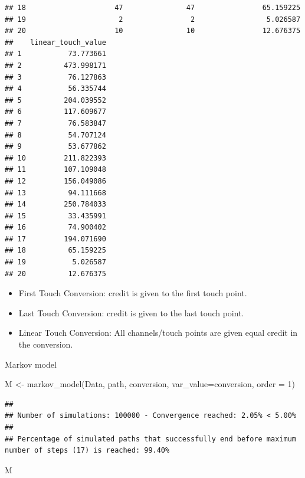 \documentclass[
]{book}
\newenvironment{Shaded}{\begin{snugshade}}{\end{snugshade}}
\newcommand{\AttributeTok}[1]{\textcolor[rgb]{0.77,0.63,0.00}{#1}}
\newcommand{\DecValTok}[1]{\textcolor[rgb]{0.00,0.00,0.81}{#1}}
\newcommand{\FunctionTok}[1]{\textcolor[rgb]{0.00,0.00,0.00}{#1}}
\newcommand{\NormalTok}[1]{#1}
\newcommand{\OtherTok}[1]{\textcolor[rgb]{0.56,0.35,0.01}{#1}}
\newcommand{\StringTok}[1]{\textcolor[rgb]{0.31,0.60,0.02}{#1}}
\begin{document}
\begin{verbatim}
## 18                     47               47                65.159225
## 19                      2                2                 5.026587
## 20                     10               10                12.676375
##    linear_touch_value
## 1           73.773661
## 2          473.998171
## 3           76.127863
## 4           56.335744
## 5          204.039552
## 6          117.609677
## 7           76.583847
## 8           54.707124
## 9           53.677862
## 10         211.822393
## 11         107.109048
## 12         156.049086
## 13          94.111668
## 14         250.784033
## 15          33.435991
## 16          74.900402
## 17         194.071690
## 18          65.159225
## 19           5.026587
## 20          12.676375
\end{verbatim}

\begin{itemize}
\item
  First Touch Conversion: credit is given to the first touch point.
\item
  Last Touch Conversion: credit is given to the last touch point.
\item
  Linear Touch Conversion: All channels/touch points are given equal credit in the conversion.
\end{itemize}

Markov model

\begin{Shaded}
\begin{Highlighting}[]
\NormalTok{M }\OtherTok{\textless{}{-}} \FunctionTok{markov\_model}\NormalTok{(Data, }\StringTok{\textquotesingle{}path\textquotesingle{}}\NormalTok{, }\StringTok{\textquotesingle{}conversion\textquotesingle{}}\NormalTok{, }\AttributeTok{var\_value=}\StringTok{\textquotesingle{}conversion\textquotesingle{}}\NormalTok{, }\AttributeTok{order =} \DecValTok{1}\NormalTok{)}
\end{Highlighting}
\end{Shaded}

\begin{verbatim}
## 
## Number of simulations: 100000 - Convergence reached: 2.05% < 5.00%
## 
## Percentage of simulated paths that successfully end before maximum number of steps (17) is reached: 99.40%
\end{verbatim}

\begin{Shaded}
\begin{Highlighting}[]
\NormalTok{M}
\end{Highlighting}
\end{Shaded}
\end{document}
